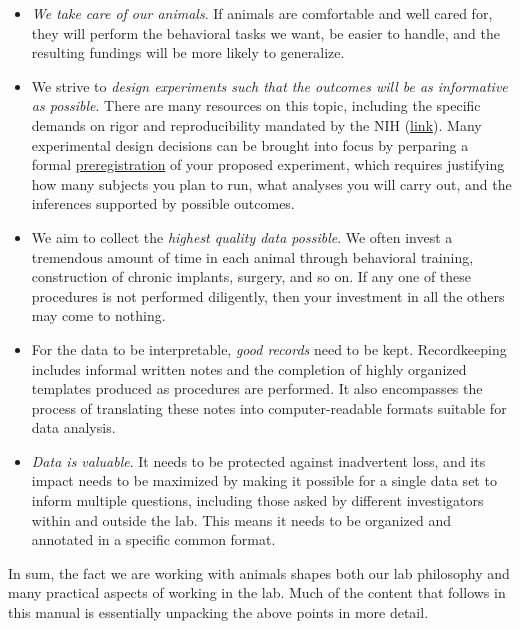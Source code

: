 \documentclass{tufte-book}
\begin{document}
\begin{itemize}

\item{{\it We take care of our animals}. If animals are comfortable and well
  cared for, they will perform the behavioral tasks we want, be easier
  to handle, and the resulting fundings will be more likely to generalize.}

\item{We strive to {\it design experiments such that the outcomes will
    be as informative as possible}. There are many resources on this
  topic, including the specific demands on rigor and reproducibility
  mandated by the NIH
  (\href{https://grants.nih.gov/policy/reproducibility/index.htm}{link}). Many
  experimental design decisions can be brought into focus by perparing
  a formal \href{https://cos.io/prereg/}{preregistration} of your
  proposed experiment, which requires justifying how many subjects you
  plan to run, what analyses you will carry out, and the inferences
  supported by possible outcomes.}

\item{We aim to collect the {\it highest quality data possible}. We
  often invest a tremendous amount of time in each animal through
  behavioral training, construction of chronic implants, surgery, and
  so on. If any one of these procedures is not performed diligently,
  then your investment in all the others may come to nothing.}

\item{For the data to be interpretable, {\it good records} need to be
  kept. Recordkeeping includes informal written notes and the
  completion of highly organized templates produced as procedures are
  performed. It also encompasses the process of translating these
  notes into computer-readable formats suitable for data analysis.}

\item{{\it Data is valuable}. It needs to be protected against inadvertent
  loss, and its impact needs to be maximized by making it possible for
  a single data set to inform multiple questions, including those
  asked by different investigators within and outside the lab. This
  means it needs to be organized and annotated in a specific common
  format.}
\end{itemize}

In sum, the fact we are working with animals shapes both our lab
philosophy and many practical aspects of working in the lab. Much of
the content that follows in this manual is essentially unpacking the
above points in more detail.
\end{document}
